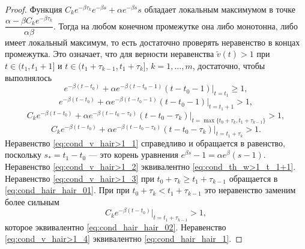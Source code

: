 \begin{proof}
	Функция $C_ke^{-\beta \tau_k}e^{-\beta s}+\alpha e^{-\beta s} s$ обладает локальным максимумом в точке $\dfrac{\alpha-\beta C_ke^{-\beta \tau_k}}{\alpha \beta}$.
	Тогда на любом конечном промежутке она либо монотонна, либо имеет локальный максимум, то есть достаточно проверять неравенство в концах промежутка. Это означает, что для верности неравенства $\tilde{v}(t)>1$ при $t\in(t_1,t_1+1]$ и  $t\in(t_1+\tau_{k-1},t_1+\tau_k]$, $k = 1,\ldots,m$,  достаточно, чтобы выполнялось  
	\begin{equation}
		\label{eq:cond_v_hair>1_1}
		e^{-\beta(t-t_0)}+\alpha e^{-\beta (t-t_0-1)} (t-t_0-1)|_{t=t_1}\geqslant 1,
	\end{equation}
	\begin{equation}
		\label{eq:cond_v_hair>1_2}
		e^{-\beta(t-t_0)}+\alpha e^{-\beta (t-t_0-1)} (t-t_0-1)|_{t=t_1+1}>1,
	\end{equation}
	\begin{equation}
		\label{eq:cond_v_hair>1_3}
		C_k e^{-\beta(t-t_0)}+\alpha e^{-\beta (t-t_0-\tau_k)} (t-t_0-\tau_k)|_{t=\max\{t_0+\tau_k,t_1+\tau_{k-1}\}}>1,
	\end{equation}
	\begin{equation}
		\label{eq:cond_v_hair>1_4}
		C_k e^{-\beta(t-t_0)}+\alpha e^{-\beta (t-t_0-\tau_k)} (t-t_0-\tau_k)|_{t=t_1+\tau_k}>1.
	\end{equation}
	Неравенство \eqref{eq:cond_v_hair>1_1} справедливо и обращается в равенство, поскольку $s_*=t_1-t_0$ --- это корень уравнения $e^{\beta s}-1=\alpha e^{\beta}(s-1)$. Неравенство \eqref{eq:cond_v_hair>1_2} эквивалентно \eqref{eq:cond_th_w>1_t_1+1}. Неравенство \eqref{eq:cond_v_hair>1_3} при $t_0+\tau_k\geqslant t_1+\tau_{k-1}$ обращается в \eqref{eq:cond_hair_hair_01}. При при $t_0+\tau_k<t_1+\tau_{k-1}$ это неравенство заменим более сильным
	\[C_ke^{-\beta(t-t_0)}|_{t=t_1+\tau_{k-1}}>1,\]
	которое эквивалентно \eqref{eq:cond_hair_hair_02}.
	Неравенство \eqref{eq:cond_v_hair>1_4} эквивалентно \eqref{eq:cond_hair_hair_1}.
	
\end{proof}

